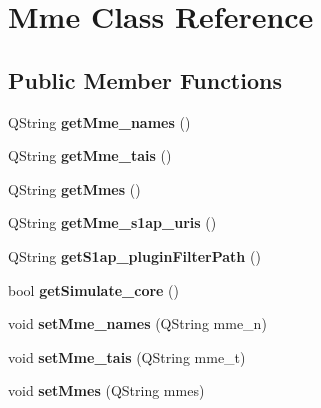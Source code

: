 \hypertarget{class_mme}{}\section{Mme Class Reference}
\label{class_mme}
\subsection*{Public Member Functions}
\begin{DoxyCompactItemize}
\item 
Q\+String {\bfseries get\+Mme\+\_\+names} ()\hypertarget{class_mme_acf8cc5eea3f128cf716df830934c9738}{}\label{class_mme_acf8cc5eea3f128cf716df830934c9738}

\item 
Q\+String {\bfseries get\+Mme\+\_\+tais} ()\hypertarget{class_mme_a028fb04b730be81b01d15a48c6aef434}{}\label{class_mme_a028fb04b730be81b01d15a48c6aef434}

\item 
Q\+String {\bfseries get\+Mmes} ()\hypertarget{class_mme_ab9ed47194ade2813acf9bd5267f5c577}{}\label{class_mme_ab9ed47194ade2813acf9bd5267f5c577}

\item 
Q\+String {\bfseries get\+Mme\+\_\+s1ap\+\_\+uris} ()\hypertarget{class_mme_ab516f0a6cc19c2768585ae006c3b8f62}{}\label{class_mme_ab516f0a6cc19c2768585ae006c3b8f62}

\item 
Q\+String {\bfseries get\+S1ap\+\_\+plugin\+Filter\+Path} ()\hypertarget{class_mme_ab3785d77aeae4dc631c8b18021994dc3}{}\label{class_mme_ab3785d77aeae4dc631c8b18021994dc3}

\item 
bool {\bfseries get\+Simulate\+\_\+core} ()\hypertarget{class_mme_ab251edc500ad23142ff979b982fc70ad}{}\label{class_mme_ab251edc500ad23142ff979b982fc70ad}

\item 
void {\bfseries set\+Mme\+\_\+names} (Q\+String mme\+\_\+n)\hypertarget{class_mme_a13d3f389d9915b1dd0d993d0a3d5efbd}{}\label{class_mme_a13d3f389d9915b1dd0d993d0a3d5efbd}

\item 
void {\bfseries set\+Mme\+\_\+tais} (Q\+String mme\+\_\+t)\hypertarget{class_mme_afe0236d4fa355276861c165fcd837499}{}\label{class_mme_afe0236d4fa355276861c165fcd837499}

\item 
void {\bfseries set\+Mmes} (Q\+String mmes)\hypertarget{class_mme_a7637668ddcc2735534dea48c3cf66ed7}{}\label{class_mme_a7637668ddcc2735534dea48c3cf66ed7}


\end{DoxyCompactItemize}
